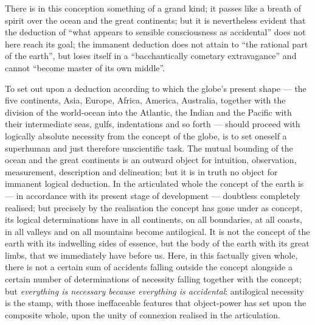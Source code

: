 \documentclass[12pt,a4paper]{book}
\begin{document}
There is in this conception something of a grand kind; it passes like a breath of spirit over the ocean and the great
continents; but it is nevertheless evident that the deduction of ``what appears to sensible consciousness as accidental''
does not here reach its goal; the immanent deduction does not attain to ``the rational part of the earth'', but loses
itself in a ``bacchantically cometary extravagance'' and cannot ``become master of its own middle''.

To set out upon a deduction according to which the globe's present shape --- the five continents, Asia, Europe, Africa,
America, Australia, together with the division of the world-ocean into the Atlantic, the Indian and the Pacific with
their intermediate seas, gulfs, indentations and so forth --- should proceed with logically absolute necessity from the
concept of the globe, is to set oneself a superhuman and just therefore unscientific task. The mutual bounding of the
ocean and the great continents is an outward object for intuition, observation, measurement, description and delineation;
but it is in truth no object for immanent logical deduction. In the articulated whole the concept of the earth is ---
in accordance with its present stage of development --- doubtless completely realised; but precisely by the realisation
the concept has gone under as concept, its logical determinations have in all continents, on all boundaries, at all
coasts, in all valleys and on all mountains become antilogical. It is not the concept of the earth with its indwelling
sides of essence, but the body of the earth with its great limbs, that we immediately have before us. Here, in this
factually
given whole, there is not a certain sum of accidents falling outside the concept alongside a certain number of
determinations of necessity falling together with the concept; but \emph{everything is necessary because everything is
accidental}: antilogical necessity is the stamp, with those ineffaceable features that object-power has set upon the
composite whole, upon the unity of connexion realised in the articulation.
\end{document}
